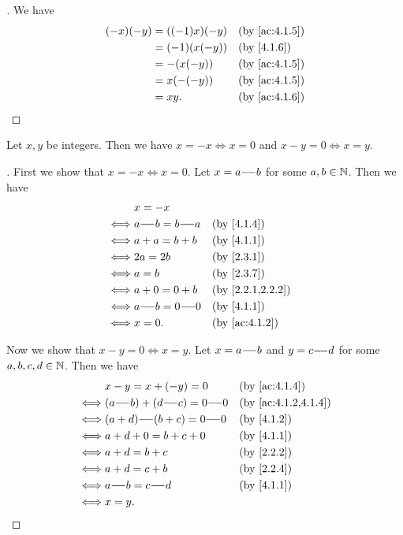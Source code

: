 \begin{proof}[]
  We have
  \begin{align*}
    (-x) (-y) & = ((-1) x) (-y) &  & \by{ac:4.1.5} \\
              & = (-1) (x (-y)) &  & \by{4.1.6}    \\
              & = -(x (-y))     &  & \by{ac:4.1.5} \\
              & = x (-(-y))     &  & \by{ac:4.1.5} \\
              & = xy.           &  & \by{ac:4.1.6}
  \end{align*}
\end{proof}

\begin{ac}\label{ac:4.1.8}
  Let \(x, y\) be integers.
  Then we have \(x = -x \iff x = 0\) and \(x - y = 0 \iff x = y\).
\end{ac}

\begin{proof}[]
  First we show that \(x = -x \iff x = 0\).
  Let \(x = a {-}\!{-} b\) for some \(a, b \in \mathbb{N}\).
  Then we have
  \begin{align*}
         & x = -x                                  \\
    \iff & a \mm b = b \mm a &  & \by{4.1.4}       \\
    \iff & a + a = b + b     &  & \by{4.1.1}       \\
    \iff & 2a = 2b           &  & \by{2.3.1}       \\
    \iff & a = b             &  & \by{2.3.7}       \\
    \iff & a + 0 = 0 + b     &  & \by{2.2.1,2.2.2} \\
    \iff & a \mm b = 0 \mm 0 &  & \by{4.1.1}       \\
    \iff & x = 0.            &  & \by{ac:4.1.2}
  \end{align*}

  Now we show that \(x - y = 0 \iff x = y\).
  Let \(x = a {-}\!{-} b\) and \(y = c {-}\!{-} d\) for some \(a, b, c, d \in \mathbb{N}\).
  Then we have
  \begin{align*}
         & x - y = x + (-y) = 0            &  & \by{ac:4.1.4}       \\
    \iff & (a \mm b) + (d \mm c) = 0 \mm 0 &  & \by{ac:4.1.2,4.1.4} \\
    \iff & (a + d) \mm (b + c) = 0 \mm 0   &  & \by{4.1.2}          \\
    \iff & a + d + 0 = b + c + 0           &  & \by{4.1.1}          \\
    \iff & a + d = b + c                   &  & \by{2.2.2}          \\
    \iff & a + d = c + b                   &  & \by{2.2.4}          \\
    \iff & a \mm b = c \mm d               &  & \by{4.1.1}          \\
    \iff & x = y.
  \end{align*}
\end{proof}

